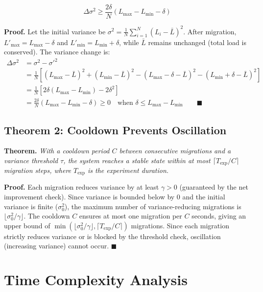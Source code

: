 \documentclass[12pt,a4paper]{report}
\begin{document}
\begin{equation}
\Delta\sigma^2 \geq \frac{2\delta}{N}(L_{\max} - L_{\min} - \delta)
\end{equation}

\textbf{Proof.} Let the initial variance be $\sigma^2 = \frac{1}{N}\sum_{i=1}^{N}(L_i - \bar{L})^2$. After migration, $L'_{\max} = L_{\max} - \delta$ and $L'_{\min} = L_{\min} + \delta$, while $\bar{L}$ remains unchanged (total load is conserved). The variance change is:
\begin{align}
\Delta\sigma^2 &= \sigma^2 - \sigma'^2 \\
&= \frac{1}{N}\left[(L_{\max} - \bar{L})^2 + (L_{\min} - \bar{L})^2 - (L_{\max} - \delta - \bar{L})^2 - (L_{\min} + \delta - \bar{L})^2\right] \\
&= \frac{1}{N}\left[2\delta(L_{\max} - L_{\min}) - 2\delta^2\right] \\
&= \frac{2\delta}{N}(L_{\max} - L_{\min} - \delta) \geq 0 \quad \text{when } \delta \leq L_{\max} - L_{\min} \qquad \blacksquare
\end{align}

\subsection{Theorem 2: Cooldown Prevents Oscillation}

\textbf{Theorem.} \textit{With a cooldown period $C$ between consecutive migrations and a variance threshold $\tau$, the system reaches a stable state within at most $\lceil T_{\text{exp}}/C \rceil$ migration steps, where $T_{\text{exp}}$ is the experiment duration.}

\textbf{Proof.} Each migration reduces variance by at least $\gamma > 0$ (guaranteed by the net improvement check). Since variance is bounded below by 0 and the initial variance is finite ($\sigma^2_0$), the maximum number of variance-reducing migrations is $\lfloor \sigma^2_0 / \gamma \rfloor$. The cooldown $C$ ensures at most one migration per $C$ seconds, giving an upper bound of $\min(\lfloor \sigma^2_0/\gamma \rfloor, \lceil T_{\text{exp}}/C \rceil)$ migrations. Since each migration strictly reduces variance or is blocked by the threshold check, oscillation (increasing variance) cannot occur. $\blacksquare$

\section{Time Complexity Analysis}
\end{document}
